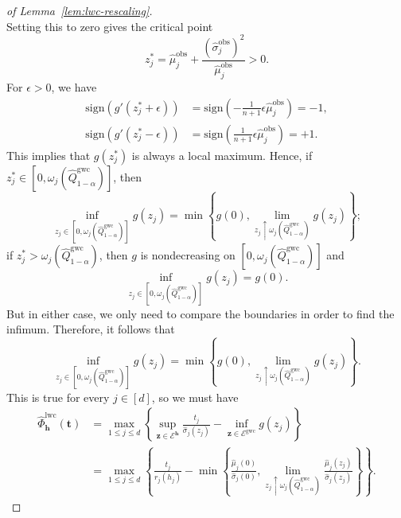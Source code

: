\begin{proof}[of Lemma~\ref{lem:lwc-rescaling}]
\[\]
Setting this to zero gives the critical point
\[
z^\ast_j = \hat{\mu}^\mathrm{obs}_j + \frac{(\hat{\sigma}^\mathrm{obs}_j)^2}{\hat{\mu}^\mathrm{obs}_j}> 0.
\]
For $\epsilon>0$, we have
\begin{align*}
    \mathrm{sign}(g'(z^*_j+\epsilon)) &= \mathrm{sign}\left(-\tfrac{1}{n+1}\epsilon\hat{\mu}^\mathrm{obs}_j\right) = -1,\\
    \mathrm{sign}(g'(z^*_j-\epsilon)) &= \mathrm{sign}\left(\tfrac{1}{n+1}\epsilon\hat{\mu}^\mathrm{obs}_j\right) = +1.
\end{align*}
This implies that $g(z^*_j)$ is always a local maximum. Hence, if $z^*_j \in [0, \omega_j(\hat{Q}^{\mathrm{gwc}}_{1-\alpha})]$, then 
\[
\inf_{z_j \in [0, \omega_j(\hat{Q}^{\mathrm{gwc}}_{1-\alpha})]}g(z_j) = \min\left\{g(0), \lim_{z_j \uparrow \omega_j(\hat{Q}^{\mathrm{gwc}}_{1-\alpha})}g(z_j)\right\};
\]
if $z^*_j > \omega_j(\hat{Q}^{\mathrm{gwc}}_{1-\alpha})$, then $g$ is nondecreasing on $[0, \omega_j(\hat{Q}^{\mathrm{gwc}}_{1-\alpha})]$ and 
\[
\inf_{z_j \in [0, \omega_j(\hat{Q}^{\mathrm{gwc}}_{1-\alpha})]}g(z_j) = g(0).
\]
But in either case, we only need to compare the boundaries in order to find the infimum. Therefore, it follows that
\[
\inf_{z_j \in [0, \omega_j(\hat{Q}^{\mathrm{gwc}}_{1-\alpha})]}g(z_j) = \min\left\{g(0), \lim_{z_j \uparrow \omega_j(\hat{Q}^{\mathrm{gwc}}_{1-\alpha})}g(z_j)\right\}.
\]
This is true for every $j \in [d]$, so we must have
\begin{align*}
  \hat{\Phi}^{\mathrm{lwc}}_{\mathbf{h}}(\mathbf t) 
  &=\max_{1\leq j\leq d}\left\{\sup_{\mathbf z \in \mathcal{E}^{\mathbf{h}}} \frac{t_j}{\hat{\sigma}_{j}(z_j)}-\inf_{\mathbf z \in \mathcal{E}^{\mathrm{gwc}}}g(z_j)\right\}\\
  & = \max_{1 \le j \le d}
\left\{\frac{t_j}{r_j(h_j)}-\min\left\{\frac{\hat{\mu}_{j}(0)}{\hat{\sigma}_{j}(0)}, \lim_{z_j \uparrow \omega_j(\hat{Q}^{\mathrm{gwc}}_{1-\alpha})}\frac{\hat{\mu}_{j}(z_j)}{\hat{\sigma}_{j}(z_j)}\right\}\right\}.
\end{align*}
\end{proof}

